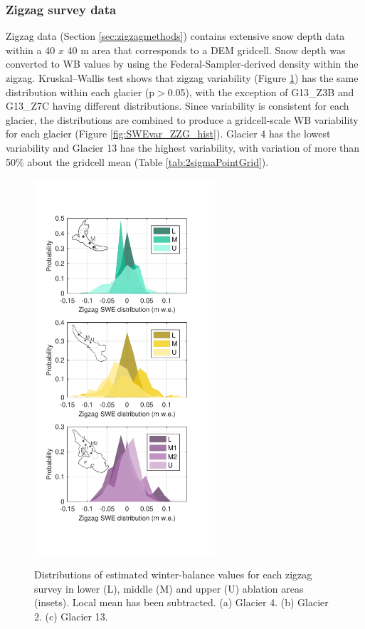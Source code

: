 \documentclass{sfuthesis}
\begin{document}
\subsubsection{Zigzag survey data}
Zigzag data (Section \ref{sec:zigzagmethods}) contains extensive snow depth data within a 40 $x$ 40 m area that corresponds to a DEM gridcell. Snow depth was converted to WB values by using the Federal-Sampler-derived density within the zigzag. Kruskal--Wallis test shows that zigzag variability (Figure \ref{fig:SWEvar_ZZ_hist}) has the same distribution within each glacier (p$>$0.05), with the exception of G13\_Z3B and G13\_Z7C having different distributions. Since variability is consistent for each glacier, the distributions are combined to produce a gridcell-scale WB variability for each glacier (Figure \ref{fig:SWEvar_ZZG_hist}). Glacier 4 has the lowest variability and Glacier 13 has the highest variability, with variation of more than 50\% about the gridcell mean (Table  \ref{tab:2sigmaPointGrid}). 

\begin{figure}[H]
	\centering
	\includegraphics[width =0.6\textwidth]{ZigzagHistogram.pdf}\\
	\caption{Distributions of estimated winter-balance values for each zigzag survey in lower (L), middle (M) and upper (U) ablation areas (insets). Local mean has been subtracted. (a) Glacier 4. (b) Glacier 2. (c) Glacier 13.}
	\label{fig:SWEvar_ZZ_hist}
\end{figure}
\end{document}
